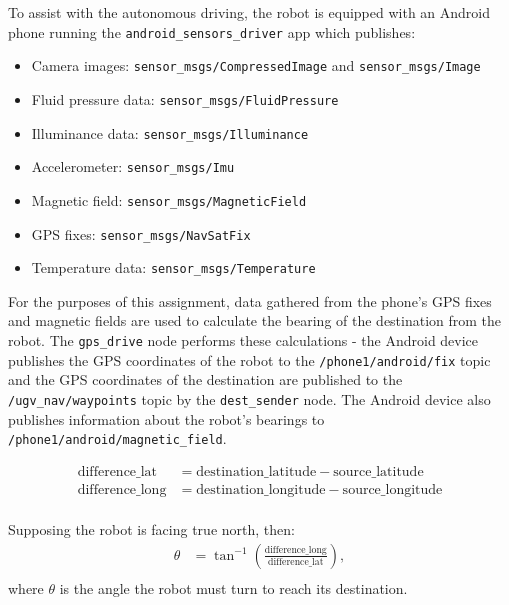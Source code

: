 \documentclass[titlepage,12pt,a4paper]{article}
\begin{document}
To assist with the autonomous driving, the robot is equipped with an Android phone running the \verb|android_sensors_driver| app which publishes:

\begin{itemize}
	\item Camera images: \verb|sensor_msgs/CompressedImage| and \verb|sensor_msgs/Image|
	\item Fluid pressure data: \verb|sensor_msgs/FluidPressure|
	\item Illuminance data: \verb|sensor_msgs/Illuminance|
	\item Accelerometer: \verb|sensor_msgs/Imu|
	\item Magnetic field: \verb|sensor_msgs/MagneticField|
	\item GPS fixes: \verb|sensor_msgs/NavSatFix|
	\item Temperature data: \verb|sensor_msgs/Temperature| \\
\end{itemize}

For the purposes of this assignment, data gathered from the phone's GPS fixes and magnetic fields are used to calculate the bearing of the destination from the robot. The \verb|gps_drive| node performs these calculations - the Android device publishes the GPS coordinates of the robot to the \verb|/phone1/android/fix| topic and the GPS coordinates of the destination are published to the \verb|/ugv_nav/waypoints| topic by the \verb|dest_sender| node. The Android device also publishes information about the robot's bearings to \verb|/phone1/android/magnetic_field|.

\begin{align*}
	\text{difference\_lat}   	&= 	\text{destination\_latitude} - \text{source\_latitude} \\
	\text{difference\_long}	&= 	\text{destination\_longitude} - \text{source\_longitude} \\
\end{align*}

Supposing the robot is facing true north, then:
\begin{align*}
	\theta	&=	\tan^{-1}({\frac{\text{difference\_long}}{\text{difference\_lat}}}),\\
\end{align*}
where $\theta$ is the angle the robot must turn to reach its destination.
\end{document}
